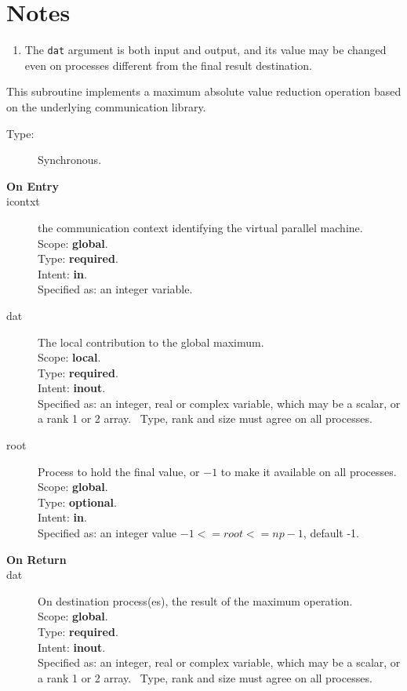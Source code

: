 \section*{Notes}
\begin{enumerate}
\item The \verb|dat| argument is both input and output, and its
  value may be changed even on processes different from the final
  result destination.
\end{enumerate}



This subroutine implements a maximum absolute value reduction
operation based on the underlying communication library. 
\begin{description}
\item[Type:] Synchronous.
\item[\bf  On Entry ]
\item[icontxt] the communication context identifying the virtual
  parallel machine.\\
Scope: {\bf global}.\\
Type: {\bf required}.\\
Intent: {\bf in}.\\
Specified as: an integer variable.
\item[dat] The local contribution to the global maximum.\\
Scope: {\bf local}.\\
Type: {\bf required}.\\
Intent: {\bf inout}.\\
Specified as: an integer, real or complex variable, which may be a
scalar, or a rank 1 or 2 array. \
Type, rank and size must agree on all processes.
\item[root] Process to hold the final value, or $-1$ to make it available
  on all processes.\\
Scope: {\bf global}.\\
Type: {\bf optional}.\\
Intent: {\bf in}.\\
Specified as: an integer value $-1<= root <= np-1$, default -1. \\
\end{description}


\begin{description}
\item[\bf On Return]
\item[dat] On destination process(es), the result of the maximum operation.\\
Scope: {\bf global}.\\
Type: {\bf required}.\\
Intent: {\bf inout}.\\
Specified as: an integer, real or complex variable, which may be a
scalar, or a rank 1 or 2 array. \
Type, rank and size must agree on all processes.
\end{description}


